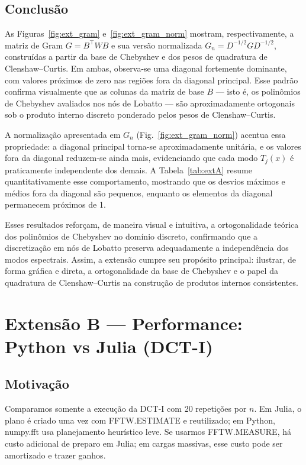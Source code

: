 \documentclass[11pt,a4paper]{article}
\begin{document}
\subsection*{Conclusão}
As Figuras~\ref{fig:ext_gram} e~\ref{fig:ext_gram_norm} mostram, respectivamente,
a matriz de Gram $G = B^\top W B$ e sua versão normalizada $G_n = D^{-1/2} G D^{-1/2}$,
construídas a partir da base de Chebyshev e dos pesos de quadratura de Clenshaw--Curtis.
Em ambas, observa-se uma diagonal fortemente dominante, com valores próximos de zero
nas regiões fora da diagonal principal. Esse padrão confirma visualmente
que as colunas da matriz de base $B$ — isto é, os polinômios de Chebyshev avaliados
nos nós de Lobatto — são aproximadamente ortogonais sob o produto interno discreto
ponderado pelos pesos de Clenshaw--Curtis.

A normalização apresentada em $G_n$ (Fig.~\ref{fig:ext_gram_norm})
acentua essa propriedade: a diagonal principal torna-se aproximadamente unitária,
e os valores fora da diagonal reduzem-se ainda mais, evidenciando que cada modo
$T_j(x)$ é praticamente independente dos demais.
A Tabela~\ref{tab:extA} resume quantitativamente esse comportamento,
mostrando que os desvios máximos e médios fora da diagonal são pequenos,
enquanto os elementos da diagonal permanecem próximos de 1.

Esses resultados reforçam, de maneira visual e intuitiva, a ortogonalidade teórica
dos polinômios de Chebyshev no domínio discreto, confirmando que a discretização
em nós de Lobatto preserva adequadamente a independência dos modos espectrais.
Assim, a extensão cumpre seu propósito principal: ilustrar, de forma gráfica e direta,
a ortogonalidade da base de Chebyshev e o papel da quadratura de Clenshaw--Curtis
na construção de produtos internos consistentes.


\section{Extensão B --- Performance: Python vs Julia (DCT-I)}
\subsection*{Motivação}
Comparamos somente a execução da DCT-I com 20 repetições por $n$. Em Julia, o plano é criado uma vez com FFTW.ESTIMATE e reutilizado; em Python, numpy.fft usa planejamento heurístico leve. Se usarmos FFTW.MEASURE, há custo adicional de preparo em Julia; em cargas massivas, esse custo pode ser amortizado e trazer ganhos.
\end{document}
